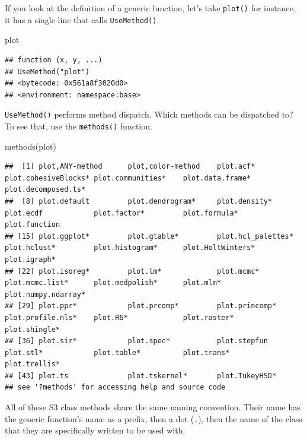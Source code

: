 \documentclass[
  12pt,
  krantz2]{krantz}
\makeatletter
\newenvironment{Shaded}{\begin{snugshade}}{\end{snugshade}}
\newcommand{\FunctionTok}[1]{\textcolor[rgb]{0,0,0}{#1}}
\newcommand{\NormalTok}[1]{#1}
\newenvironment{kframe}{%
\medskip{}
\setlength{\fboxsep}{.8em}
 \def\at@end@of@kframe{}%
 \ifinner\ifhmode%
  \def\at@end@of@kframe{\end{minipage}}%
  \begin{minipage}{\columnwidth}%
 \fi\fi%
 \def\FrameCommand##1{\hskip\@totalleftmargin \hskip-\fboxsep
 \colorbox{shadecolor}{##1}\hskip-\fboxsep
     \hskip-\linewidth \hskip-\@totalleftmargin \hskip\columnwidth}%
 \MakeFramed {\advance\hsize-\width
   \@totalleftmargin\z@ \linewidth\hsize
   \@setminipage}}%
 {\par\unskip\endMakeFramed%
 \at@end@of@kframe}
\renewenvironment{Shaded}{\begin{kframe}}{\end{kframe}}
\makeatother
\begin{document}
If you look at the definition of a generic function, let's take \texttt{plot()} for instance, it has a single line that calls \texttt{UseMethod()}.

\begin{Shaded}
\begin{Highlighting}[]
\NormalTok{plot}
\end{Highlighting}
\end{Shaded}

\begin{verbatim}
## function (x, y, ...) 
## UseMethod("plot")
## <bytecode: 0x561a8f3020d0>
## <environment: namespace:base>
\end{verbatim}

\texttt{UseMethod()} performs method dispatch. Which methods can be dispatched to? To see that, use the \texttt{methods()} function.

\begin{Shaded}
\begin{Highlighting}[]
\FunctionTok{methods}\NormalTok{(plot)}
\end{Highlighting}
\end{Shaded}

\begin{verbatim}
##  [1] plot,ANY-method      plot,color-method    plot.acf*            plot.cohesiveBlocks* plot.communities*    plot.data.frame*     plot.decomposed.ts* 
##  [8] plot.default         plot.dendrogram*     plot.density*        plot.ecdf            plot.factor*         plot.formula*        plot.function       
## [15] plot.ggplot*         plot.gtable*         plot.hcl_palettes*   plot.hclust*         plot.histogram*      plot.HoltWinters*    plot.igraph*        
## [22] plot.isoreg*         plot.lm*             plot.mcmc*           plot.mcmc.list*      plot.medpolish*      plot.mlm*            plot.numpy.ndarray* 
## [29] plot.ppr*            plot.prcomp*         plot.princomp*       plot.profile.nls*    plot.R6*             plot.raster*         plot.shingle*       
## [36] plot.sir*            plot.spec*           plot.stepfun         plot.stl*            plot.table*          plot.trans*          plot.trellis*       
## [43] plot.ts              plot.tskernel*       plot.TukeyHSD*      
## see '?methods' for accessing help and source code
\end{verbatim}

All of these S3 class methods share the same naming convention. Their name has the generic function's name as a prefix, then a dot (\texttt{.}), then the name of the class that they are specifically written to be used with.
\end{document}
